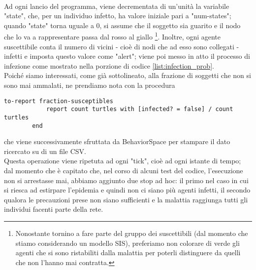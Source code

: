 \\Ad ogni lancio del programma, viene decrementata di un'unità la variabile "state", che, per un individuo infetto, ha valore iniziale pari a "num-states"; quando "state" torna uguale a $ 0 $, si assume che il soggetto sia guarito e il nodo che lo va a rappresentare passa dal rosso al giallo \footnote{Nonostante tornino a fare parte del gruppo dei suscettibili (dal momento che stiamo considerando un modello SIS), preferiamo non colorare di verde gli agenti che si sono ristabiliti dalla malattia per poterli distinguere da quelli che non l'hanno mai contratta.}. Inoltre, ogni agente suscettibile conta il numero di vicini - cioè di nodi che ad esso sono collegati - infetti e imposta questo valore come "alert"; viene poi messo in atto il processo di infezione come mostrato nella porzione di codice \ref{list:infection_prob}. \\Poiché siamo interessati, come già sottolineato, alla frazione di soggetti che non si sono mai ammalati, ne prendiamo nota con la procedura 
\begin{center}
	\begin{lstlisting}[autogobble,language={NetLogo},caption={Metodo che riporta la frazione di suscettibili che non hanno mai contratto l'infezione.},label={list:count_susceptibles}]
		to-report fraction-susceptibles
  			report count turtles with [infected? = false] / count turtles
		end	
	\end{lstlisting}
\end{center}
che viene successivamente sfruttata da BehaviorSpace per stampare il dato ricercato su di un file CSV. \\ Questa operazione viene ripetuta ad ogni "tick", cioè ad ogni istante di tempo; dal momento che è capitato che, nel corso di alcuni test del codice, l'esecuzione non si arrestasse mai, abbiamo aggiunto due stop ad hoc: il primo nel caso in cui si riesca ad estirpare l'epidemia e quindi non ci siano più agenti infetti, il secondo qualora le precauzioni prese non siano sufficienti e la malattia raggiunga tutti gli individui facenti parte della rete.
